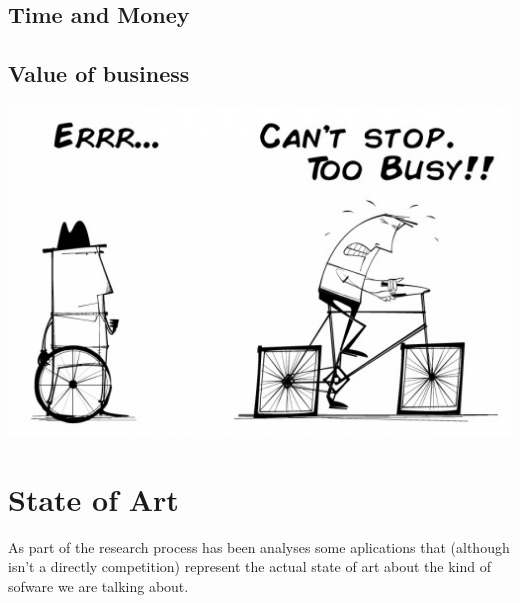 \documentclass[oneside,english,titlepage]{scrbook}
\begin{document}
\subsection{Time and Money}


\subsection{Value of business}



\includegraphics[scale=0.5]{img/toobusytoimprove.jpeg}


\section{State of Art }

As part of the research process has been analyses some aplications
that (although isn't a directly competition) represent the actual
state of art about the kind of sofware we are talking about.
\end{document}
